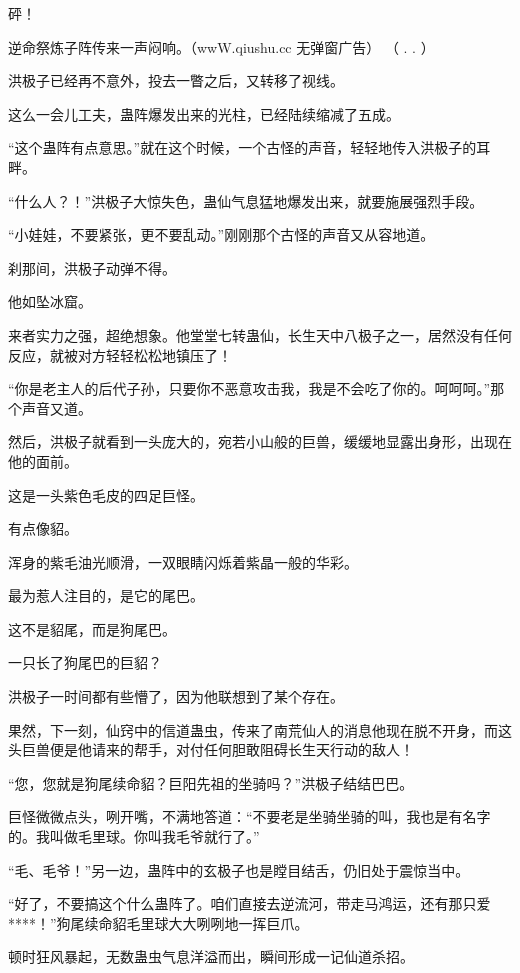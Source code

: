 
\begin{this_body}

砰！

逆命祭炼子阵传来一声闷响。（wwW.qiushu.cc 无弹窗广告） （  .    .   ）

洪极子已经再不意外，投去一瞥之后，又转移了视线。

这么一会儿工夫，蛊阵爆发出来的光柱，已经陆续缩减了五成。

“这个蛊阵有点意思。”就在这个时候，一个古怪的声音，轻轻地传入洪极子的耳畔。

“什么人？！”洪极子大惊失色，蛊仙气息猛地爆发出来，就要施展强烈手段。

“小娃娃，不要紧张，更不要乱动。”刚刚那个古怪的声音又从容地道。

刹那间，洪极子动弹不得。

他如坠冰窟。

来者实力之强，超绝想象。他堂堂七转蛊仙，长生天中八极子之一，居然没有任何反应，就被对方轻轻松松地镇压了！

“你是老主人的后代子孙，只要你不恶意攻击我，我是不会吃了你的。呵呵呵。”那个声音又道。

然后，洪极子就看到一头庞大的，宛若小山般的巨兽，缓缓地显露出身形，出现在他的面前。

这是一头紫色毛皮的四足巨怪。

有点像貂。

浑身的紫毛油光顺滑，一双眼睛闪烁着紫晶一般的华彩。

最为惹人注目的，是它的尾巴。

这不是貂尾，而是狗尾巴。

一只长了狗尾巴的巨貂？

洪极子一时间都有些懵了，因为他联想到了某个存在。

果然，下一刻，仙窍中的信道蛊虫，传来了南荒仙人的消息他现在脱不开身，而这头巨兽便是他请来的帮手，对付任何胆敢阻碍长生天行动的敌人！

“您，您就是狗尾续命貂？巨阳先祖的坐骑吗？”洪极子结结巴巴。

巨怪微微点头，咧开嘴，不满地答道：“不要老是坐骑坐骑的叫，我也是有名字的。我叫做毛里球。你叫我毛爷就行了。”

“毛、毛爷！”另一边，蛊阵中的玄极子也是瞠目结舌，仍旧处于震惊当中。

“好了，不要搞这个什么蛊阵了。咱们直接去逆流河，带走马鸿运，还有那只爱****！”狗尾续命貂毛里球大大咧咧地一挥巨爪。

顿时狂风暴起，无数蛊虫气息洋溢而出，瞬间形成一记仙道杀招。


\end{this_body}
